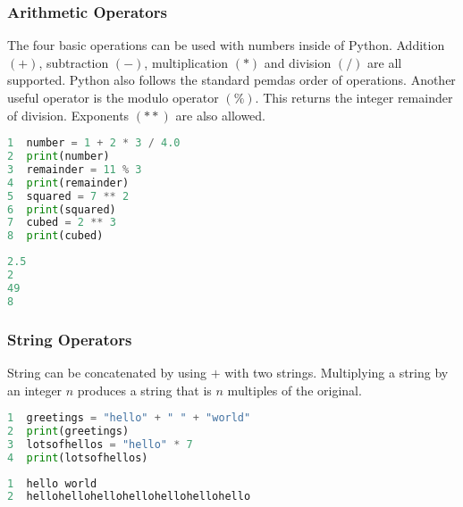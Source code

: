 \documentclass[crop=false,class=book]{standalone}
\begin{document}
\subsubsection{Arithmetic Operators}
The four basic operations can be used with numbers inside of Python. Addition $(+)$, subtraction $(-)$, multiplication $(*)$ and division $(/)$ are all supported. Python also follows the standard \gls{pemdas} order of operations. Another useful operator is the modulo operator $(\%)$. This returns the integer remainder of division. Exponents $(**)$ are also allowed.\newline
\begin{minipage}[t]{.48\textwidth}
\centering
\begin{lstlisting}[language=python,frame=single,basicstyle=\footnotesize,frame=single,caption=input]
1  number = 1 + 2 * 3 / 4.0
2  print(number)
3  remainder = 11 % 3
4  print(remainder)
5  squared = 7 ** 2
6  print(squared)
7  cubed = 2 ** 3
8  print(cubed)
\end{lstlisting}
\end{minipage}\hfill
\begin{minipage}[t]{.48\textwidth}
\centering
\begin{lstlisting}[language=python,frame=single,basicstyle=\footnotesize,frame=single,caption=output]
2.5
2
49
8
\end{lstlisting}
\end{minipage}
\subsubsection{String Operators}
String can be concatenated by using $+$ with two strings. Multiplying a string by an integer $n$ produces a string that is $n$ multiples of the original.\newline
\begin{minipage}[t]{.48\textwidth}
\centering
\begin{lstlisting}[language=python,frame=single,basicstyle=\footnotesize,frame=single,caption=input]
1  greetings = "hello" + " " + "world"
2  print(greetings)
3  lotsofhellos = "hello" * 7
4  print(lotsofhellos)
\end{lstlisting}
\end{minipage}\hfill
\begin{minipage}[t]{.48\textwidth}
\centering
\begin{lstlisting}[language=python,frame=single,basicstyle=\footnotesize,frame=single,caption=output]
1  hello world
2  hellohellohellohellohellohellohello
\end{lstlisting}
\end{minipage}
\end{document}
